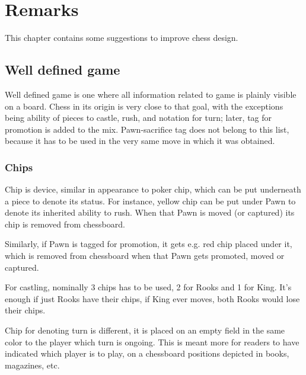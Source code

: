 

\chapter*{Remarks}
\label{ch:Remarks}

This chapter contains some suggestions to improve chess design.

\section*{Well defined game}
\label{sec:Remarks/Well defined game}

Well defined game is one where all information related to game is plainly
visible on a board. Chess in its origin is very close to that goal, with
the exceptions being ability of pieces to castle, rush, and notation for
turn; later, tag for promotion is added to the mix. Pawn-sacrifice tag
does not belong to this list, because it has to be used in the very same
move in which it was obtained.

\subsection*{Chips}
\label{sec:Remarks/Chips}

Chip is device, similar in appearance to poker chip, which can be put
underneath a piece to denote its status. For instance, yellow chip can be
put under Pawn to denote its inherited ability to rush. When that Pawn is
moved (or captured) its chip is removed from chessboard.

Similarly, if Pawn is tagged for promotion, it gets e.g. red chip placed
under it, which is removed from chessboard when that Pawn gets promoted,
moved or captured.

For castling, nominally 3 chips has to be used, 2 for Rooks and 1 for King.
It's enough if just Rooks have their chips, if King ever moves, both Rooks
would lose their chips.

Chip for denoting turn is different, it is placed on an empty field in the
same color to the player which turn is ongoing. This is meant more for
readers to have indicated which player is to play, on a chessboard positions
depicted in books, magazines, etc.


